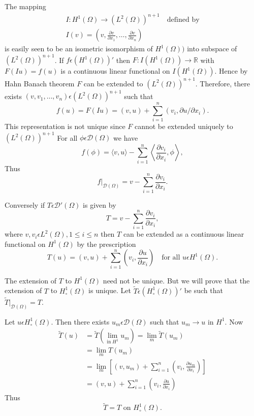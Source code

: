 The mapping 
\begin{align*}
I:H^1(\Omega)\to(L^2(\Omega))^{n+1} \quad \text{defined by}\\
I(v)=\left(v, \frac{\partial v}{\partial x_1},\ldots,\frac{\partial v}
{\partial x_n}\right)
\end{align*}
is easily seen to be an isometric isomorphism of $H^1(\Omega))$ into
subspace of $(L^2(\Omega))^{n+1}$. If $f \epsilon(H^1(\Omega))'$
then $F:I(H^1(\Omega))\to \mathbb{R}$ with $F(Iu)=f(u)$ is a continuous linear
functional on $I(H^1(\Omega))$. Hence by Hahn Banach theorem $F$ can be
extended to $(L^2(\Omega))^{n+1}$. Therefore, there exists $(v,
v_1,\ldots, v_n) \epsilon (L^2(\Omega))^{n+1}$ such that 
$$
f(u)=F(Iu)=(v, u)+\sum\limits_{i=1}^n (v_i, \partial u/\partial x_i).
$$
This representation is not unique since $F$ cannot be extended
uniquely to $(L^2(\Omega))^{n+1}$ For all $\phi \epsilon
\mathscr{D}(\Omega)$ we have 
$$
f(\phi)=\langle v, u \rangle -\sum\limits_{i=1}^n \left\langle\frac{\partial v_i} {\partial
x_i}, \phi \right\rangle ,
$$\pageoriginale
Thus
$$
f|_{\mathscr{D}(\Omega)}=v-\sum\limits_{i=1}^n\frac{\partial v_i}
{\partial x_i}. 
$$

Conversely if $T\epsilon \mathscr{D}'(\Omega)$ is given by 
$$
T=v-\sum\limits_{i=1}^n\frac{\partial v_i}{\partial x_i},
$$
where $v, v_i \epsilon L^2(\Omega), 1\leq i\leq n$ then $T$ can be
extended as a continuous linear functional on $H^1(\Omega)$ by the
prescription
$$
T(u)=(v, u)+\sum\limits_{i=1}^n \left(v_i,\frac{\partial u}{\partial x_i} \right)
\quad \text{for all } u \epsilon H^1(\Omega).
$$

The extension of $T$ to $H^1(\Omega)$ need not be unique. But we will
prove that the extension of $T$ to $H_\circ^1(\Omega)$ is unique. Let
$\tilde{T} \epsilon (H_\circ^1(\Omega))'$ be such that
$\tilde{T}|_{\mathscr{D}(\Omega)}=T$. 

Let $u \epsilon H_\circ^1(\Omega)$. Then there exists $u_m
\epsilon \mathscr{D}(\Omega)$ such that $u_m\to u$ in $H^1$. Now 
\begin{align*}
\tilde{T}(u) &= \tilde{T}(\lim\limits_{\text{in}\;H^1} u_m)= \lim_m
\tilde{T}(u_m)\\
&= \lim\limits_m T(u_m)\\
&= \lim\limits_m \left[(v, u_m) + \sum\limits_{i=1}^n \left(v_i, \frac{{\partial
u}_m}{\partial x_i}\right)\right]\\
&= (v, u)+\sum\limits_{i=1}^n \left(v_i, \frac{\partial u}{\partial x_i}\right) 
\end{align*}
Thus 
$$
\tilde{T}=T  \text{ on }  H_\circ^1(\Omega).
$$

